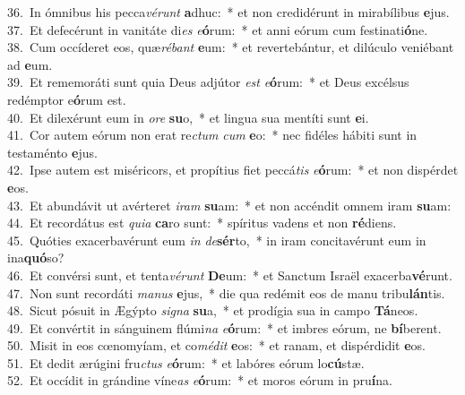 {36.~}In ómnibus his pecca\textit{vé}\textit{runt} \textbf{a}dhuc:~* et non credidérunt in mirabílibus \textbf{e}jus.\\
{37.~}Et defecérunt in vanitáte di\textit{es} \textit{e}\textbf{ó}rum:~* et anni eórum cum festinati\textbf{ó}ne.\\
{38.~}Cum occíderet eos, quæ\textit{ré}\textit{bant} \textbf{e}um:~* et revertebántur, et dilúculo veniébant ad \textbf{e}um.\\
{39.~}Et rememoráti sunt quia Deus adjútor \textit{est} \textit{e}\textbf{ó}rum:~* et Deus excélsus redémptor e\textbf{ó}rum est.\\
{40.~}Et dilexérunt eum in \textit{o}\textit{re} \textbf{su}o,~* et lingua sua mentíti sunt \textbf{e}i.\\
{41.~}Cor autem eórum non erat re\textit{ctum} \textit{cum} \textbf{e}o:~* nec fidéles hábiti sunt in testaménto \textbf{e}jus.\\
{42.~}Ipse autem est miséricors, et propítius fiet peccá\textit{tis} \textit{e}\textbf{ó}rum:~* et non dispérdet \textbf{e}os.\\
{43.~}Et abundávit ut avérteret \textit{i}\textit{ram} \textbf{su}am:~* et non accéndit omnem iram \textbf{su}am:\\
{44.~}Et recordátus est \textit{qui}\textit{a} \textbf{ca}ro sunt:~* spíritus vadens et non \textbf{ré}diens.\\
{45.~}Quóties exacerbavérunt eum \textit{in} \textit{de}\textbf{sér}to,~* in iram concitavérunt eum in ina\textbf{quó}so?\\
{46.~}Et convérsi sunt, et tenta\textit{vé}\textit{runt} \textbf{De}um:~* et Sanctum Israël exacerba\textbf{vé}runt.\\
{47.~}Non sunt recordáti \textit{ma}\textit{nus} \textbf{e}jus,~* die qua redémit eos de manu tribu\textbf{lán}tis.\\
{48.~}Sicut pósuit in Ægýpto \textit{si}\textit{gna} \textbf{su}a,~* et prodígia sua in campo \textbf{Tá}neos.\\
{49.~}Et convértit in sánguinem flúmi\textit{na} \textit{e}\textbf{ó}rum:~* et imbres eórum, ne \textbf{bí}berent.\\
{50.~}Misit in eos cœnomyíam, et co\textit{mé}\textit{dit} \textbf{e}os:~* et ranam, et dispérdidit \textbf{e}os.\\
{51.~}Et dedit ærúgini fru\textit{ctus} \textit{e}\textbf{ó}rum:~* et labóres eórum lo\textbf{cú}stæ.\\
{52.~}Et occídit in grándine víne\textit{as} \textit{e}\textbf{ó}rum:~* et moros eórum in pru\textbf{í}na.\\
